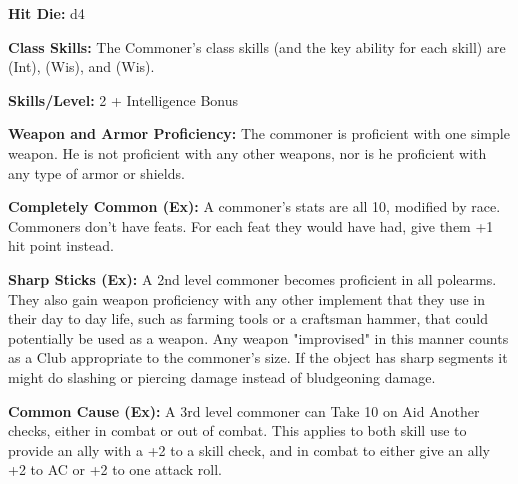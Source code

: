 


\textbf{Hit Die:} d4

\textbf{Class Skills:} The Commoner's class skills (and the key ability for each skill) are  (Int),  (Wis), and  (Wis).

\textbf{Skills/Level:} 2 + Intelligence Bonus

\poorbab
\poorfor
\poorref
\poorwil

\begin{classtable}
\end{classtable}

\classfeatures

\textbf{Weapon and Armor Proficiency:} The commoner is proficient with one simple weapon. He is not proficient with any other weapons, nor is he proficient with any type of armor or shields.

\textbf{Completely Common (Ex):} A commoner's stats are all 10, modified by race. Commoners don't have feats. For each feat they would have had, give them +1 hit point instead.

\textbf{Sharp Sticks (Ex):} A 2nd level commoner becomes proficient in all polearms. They also gain weapon proficiency with any other implement that they use in their day to day life, such as farming tools or a craftsman hammer, that could potentially be used as a weapon. Any weapon "improvised" in this manner counts as a Club appropriate to the commoner's size. If the object has sharp segments it might do slashing or piercing damage instead of bludgeoning damage.

\textbf{Common Cause (Ex):} A 3rd level commoner can Take 10 on Aid Another checks, either in combat or out of combat. This applies to both skill use to provide an ally with a +2 to a skill check, and in combat to either give an ally +2 to AC or +2 to one attack roll.